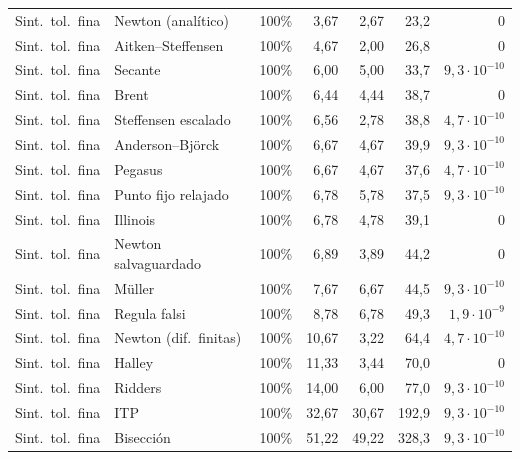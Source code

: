 \begin{longtable}{@{}llrrrrr@{}}
Sint.\ tol.\ fina & Newton (analítico) & 100\% & 3{,}67 & 2{,}67 & 23{,}2 & $0$ \\
Sint.\ tol.\ fina & Aitken--Steffensen & 100\% & 4{,}67 & 2{,}00 & 26{,}8 & $0$ \\
Sint.\ tol.\ fina & Secante & 100\% & 6{,}00 & 5{,}00 & 33{,}7 & $9{,}3\cdot10^{-10}$ \\
Sint.\ tol.\ fina & Brent & 100\% & 6{,}44 & 4{,}44 & 38{,}7 & $0$ \\
Sint.\ tol.\ fina & Steffensen escalado & 100\% & 6{,}56 & 2{,}78 & 38{,}8 & $4{,}7\cdot10^{-10}$ \\
Sint.\ tol.\ fina & Anderson--Björck & 100\% & 6{,}67 & 4{,}67 & 39{,}9 & $9{,}3\cdot10^{-10}$ \\
Sint.\ tol.\ fina & Pegasus & 100\% & 6{,}67 & 4{,}67 & 37{,}6 & $4{,}7\cdot10^{-10}$ \\
Sint.\ tol.\ fina & Punto fijo relajado & 100\% & 6{,}78 & 5{,}78 & 37{,}5 & $9{,}3\cdot10^{-10}$ \\
Sint.\ tol.\ fina & Illinois & 100\% & 6{,}78 & 4{,}78 & 39{,}1 & $0$ \\
Sint.\ tol.\ fina & Newton salvaguardado & 100\% & 6{,}89 & 3{,}89 & 44{,}2 & $0$ \\
Sint.\ tol.\ fina & Müller & 100\% & 7{,}67 & 6{,}67 & 44{,}5 & $9{,}3\cdot10^{-10}$ \\
Sint.\ tol.\ fina & Regula falsi & 100\% & 8{,}78 & 6{,}78 & 49{,}3 & $1{,}9\cdot10^{-9}$ \\
Sint.\ tol.\ fina & Newton (dif.\ finitas) & 100\% & 10{,}67 & 3{,}22 & 64{,}4 & $4{,}7\cdot10^{-10}$ \\
Sint.\ tol.\ fina & Halley & 100\% & 11{,}33 & 3{,}44 & 70{,}0 & $0$ \\
Sint.\ tol.\ fina & Ridders & 100\% & 14{,}00 & 6{,}00 & 77{,}0 & $9{,}3\cdot10^{-10}$ \\
Sint.\ tol.\ fina & ITP & 100\% & 32{,}67 & 30{,}67 & 192{,}9 & $9{,}3\cdot10^{-10}$ \\
Sint.\ tol.\ fina & Bisección & 100\% & 51{,}22 & 49{,}22 & 328{,}3 & $9{,}3\cdot10^{-10}$ \\
\midrule
\bottomrule
\end{longtable}